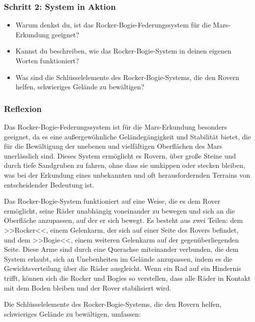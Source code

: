 \documentclass{vorlage-design-main}
\begin{document}
\hypertarget{schritt-2-system-in-aktion}{%
\subsubsection{Schritt 2: System in
Aktion}\label{schritt-2-system-in-aktion}}

\begin{itemize}
\item
  Warum denkst du, ist das Rocker-Bogie-Federungssystem für die
  Mars-Erkundung geeignet?
\item
  Kannst du beschreiben, wie das Rocker-Bogie-System in deinen eigenen
  Worten funktioniert?
\item
  Was sind die Schlüsselelemente des Rocker-Bogie-Systems, die den
  Rovern helfen, schwieriges Gelände zu bewältigen?
\end{itemize}

\hypertarget{reflexion}{%
\subsubsection{Reflexion}\label{reflexion}}

Das Rocker-Bogie-Federungssystem ist für die Mars-Erkundung besonders
geeignet, da es eine außergewöhnliche Geländegängigkeit und Stabilität
bietet, die für die Bewältigung der unebenen und vielfältigen
Oberflächen des Mars unerlässlich sind. Dieses System ermöglicht es
Rovern, über große Steine und durch tiefe Sandgruben zu fahren, ohne
dass sie umkippen oder stecken bleiben, was bei der Erkundung eines
unbekannten und oft herausfordernden Terrains von entscheidender
Bedeutung ist.

Das Rocker-Bogie-System funktioniert auf eine Weise, die es dem Rover
ermöglicht, seine Räder unabhängig voneinander zu bewegen und sich an
die Oberfläche anzupassen, auf der er sich bewegt. Es besteht aus zwei
Teilen: dem >>Rocker<<, einem Gelenkarm, der sich auf einer Seite des
Rovers befindet, und dem >>Bogie<<, einem weiteren Gelenkarm auf der
gegenüberliegenden Seite. Diese Arme sind durch eine Querachse
miteinander verbunden, die dem System erlaubt, sich an Unebenheiten im
Gelände anzupassen, indem es die Gewichtsverteilung über die Räder
ausgleicht. Wenn ein Rad auf ein Hindernis trifft, können sich die
Rocker und Bogies so verstellen, dass alle Räder in Kontakt mit dem
Boden bleiben und der Rover stabilisiert wird.

Die Schlüsselelemente des Rocker-Bogie-Systems, die den Rovern helfen,
schwieriges Gelände zu bewältigen, umfassen:
\end{document}
